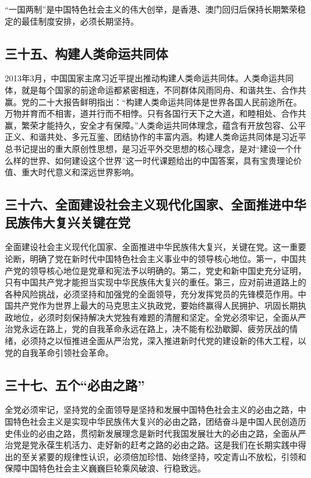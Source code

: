 \documentclass[UTF8,11pt,a4paper]{ctexart}
\begin{document}
“一国两制”是中国特色社会主义的伟大创举，是香港、澳门回归后保持长期繁荣稳定的最佳制度安排，必须长期坚持。

\subsection*{三十五、构建人类命运共同体}

2013年3月，中国国家主席习近平提出推动构建人类命运共同体。人类命运共同体，就是每个国家的前途命运都紧密相连，不同群体风雨同舟、和谐共生、合作共赢。党的二十大报告鲜明指出：“构建人类命运共同体是世界各国人民前途所在。万物并育而不相害，道并行而不相悖。只有各国行天下之大道，和睦相处、合作共赢，繁荣才能持久，安全才有保障。”人类命运共同体理念，蕴含有开放包容、公平正义、和谐共处、多元互鉴、团结协作的丰富内涵。构建人类命运共同体是习近平总书记提出的重大原创性思想，是习近平外交思想的核心理念，是对“建设一个什么样的世界、如何建设这个世界”这一时代课题给出的中国答案，具有宝贵理论价值、重大时代意义和深远世界影响。

\subsection*{三十六、全面建设社会主义现代化国家、全面推进中华民族伟大复兴关键在党}

全面建设社会主义现代化国家、全面推进中华民族伟大复兴，关键在党。这一重要论断，明确了党在新时代中国特色社会主义事业中的领导核心地位。第一，中国共产党的领导核心地位是党章和宪法予以明确的。第二，党史和新中国史充分证明，只有中国共产党才能担当实现中华民族伟大复兴的重任。第三，应对前进道路上的各种风险挑战，必须坚持和加强党的全面领导，充分发挥党员的先锋模范作用。中国共产党作为世界上最大的马克思主义执政党，要始终赢得人民拥护、巩固长期执政地位，必须时刻保持解决大党独有难题的清醒和坚定。全党必须牢记，全面从严治党永远在路上，党的自我革命永远在路上，决不能有松劲歇脚、疲劳厌战的情绪，必须持之以恒推进全面从严治党，深入推进新时代党的建设新的伟大工程，以党的自我革命引领社会革命。

\subsection*{三十七、五个“必由之路”}

全党必须牢记，坚持党的全面领导是坚持和发展中国特色社会主义的必由之路，中国特色社会主义是实现中华民族伟大复兴的必由之路，团结奋斗是中国人民创造历史伟业的必由之路，贯彻新发展理念是新时代我国发展壮大的必由之路，全面从严治党是党永葆生机活力、走好新的赶考之路的必由之路。这是我们在长期实践中得出的至关紧要的规律性认识，必须倍加珍惜、始终坚持，咬定青山不放松，引领和保障中国特色社会主义巍巍巨轮乘风破浪、行稳致远。
\end{document}
